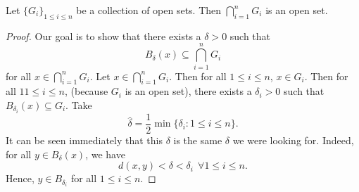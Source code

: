 \begin{prop}
    Let \( \{  {G}_{i} \}_{1 \leq i \leq n }\) be a collection of open sets. Then \( \bigcap_{  i = 1  }^{ n  }  {G}_{i} \) is an open set.
\end{prop}

\begin{proof}
Our goal is to show that there exists a \( \delta > 0  \) such that 
\[  {B}_{\delta}(x) \subseteq \bigcap_{  i =1  }^{ n }  {G}_{i} \]
for all \( x \in \bigcap_{  i = 1  }^{ n } {G}_{i}  \).
Let \( x \in \bigcap_{  i = 1  }^{ n  }  {G}_{i} \). Then for all \( 1 \leq i \leq n  \), \( x \in {G}_{i} \). Then for all \( 1 1 \leq i \leq n  \), (because \( {G}_{i} \) is an open set), there exists a \( \delta_i > 0  \) such that \( {B}_{{\delta}_{i}}(x) \subseteq  {G}_{i} \). Take
\[  \hat{\delta} = \frac{ 1 }{ 2 } \min \{ {\delta}_{i} : 1 \leq i \leq n  \}. \]
It can be seen immediately that this \( \delta  \) is the same \( \delta  \) we were looking for. Indeed, for all \( y \in {B}_{\delta}(x) \), we have 
\[  d(x,y) < \delta < {\delta}_{i} \ \ \forall 1 \leq i \leq n.  \]
Hence, \( y \in {B}_{{\delta}_{i}} \) for all \( 1 \leq i \leq n  \).
\end{proof}


